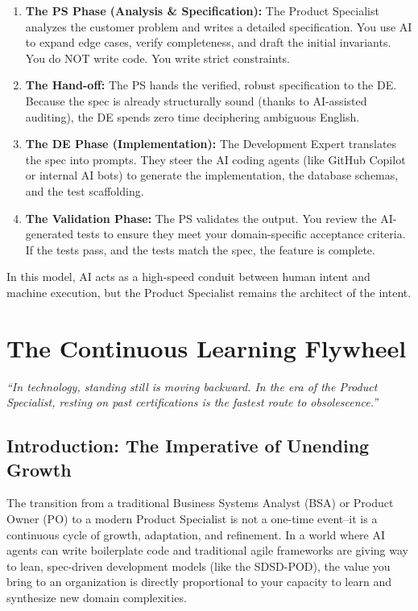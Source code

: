\documentclass[
  11pt,
  openany,
  oneside]{book}
\providecommand{\tightlist}{%
  \setlength{\itemsep}{0pt}\setlength{\parskip}{0pt}}
\renewenvironment{quote}{\begin{customquote}}{\end{customquote}}
\begin{document}
\begin{enumerate}
\def\labelenumi{\arabic{enumi}.}
\tightlist
\item
  \textbf{The PS Phase (Analysis \& Specification):} The Product
  Specialist analyzes the customer problem and writes a detailed
  specification. You use AI to expand edge cases, verify completeness,
  and draft the initial invariants. You do NOT write code. You write
  strict constraints.
\item
  \textbf{The Hand-off:} The PS hands the verified, robust specification
  to the DE. Because the spec is already structurally sound (thanks to
  AI-assisted auditing), the DE spends zero time deciphering ambiguous
  English.
\item
  \textbf{The DE Phase (Implementation):} The Development Expert
  translates the spec into prompts. They steer the AI coding agents
  (like GitHub Copilot or internal AI bots) to generate the
  implementation, the database schemas, and the test scaffolding.
\item
  \textbf{The Validation Phase:} The PS validates the output. You review
  the AI-generated tests to ensure they meet your domain-specific
  acceptance criteria. If the tests pass, and the tests match the spec,
  the feature is complete.
\end{enumerate}

In this model, AI acts as a high-speed conduit between human intent and
machine execution, but the Product Specialist remains the architect of
the intent.

\chapter{The Continuous Learning
Flywheel}\label{the-continuous-learning-flywheel-1}

\begin{quote}
\emph{``In technology, standing still is moving backward. In the era of
the Product Specialist, resting on past certifications is the fastest
route to obsolescence.''}
\end{quote}

\section{Introduction: The Imperative of Unending
Growth}\label{introduction-the-imperative-of-unending-growth}

The transition from a traditional Business Systems Analyst (BSA) or
Product Owner (PO) to a modern Product Specialist is not a one-time
event--it is a continuous cycle of growth, adaptation, and refinement.
In a world where AI agents can write boilerplate code and traditional
agile frameworks are giving way to lean, spec-driven development models
(like the SDSD-POD), the value you bring to an organization is directly
proportional to your capacity to learn and synthesize new domain
complexities.
\end{document}
